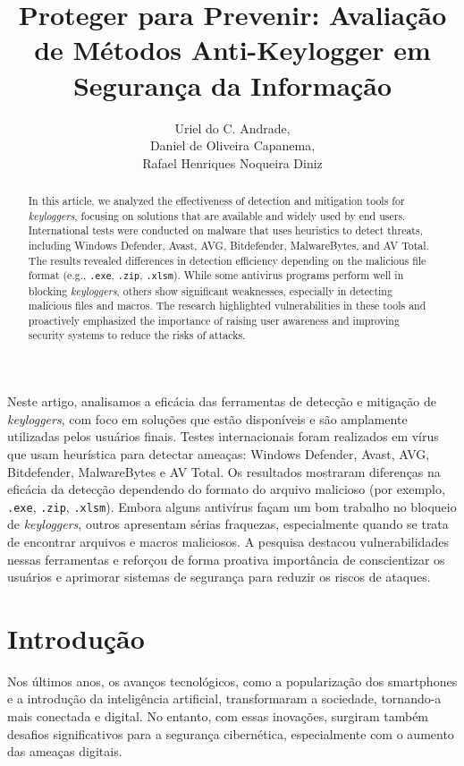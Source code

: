 \documentclass[12pt]{article}
\title{Proteger para Prevenir: Avaliação de Métodos Anti-Keylogger em Segurança da Informação\\ }
\author{Uriel do C. Andrade\inst{1},\\
Daniel de Oliveira Capanema\inst{1}, \\
Rafael Henriques Noqueira Diniz\inst{1}}
\begin{document}
\maketitle
\begin{abstract}
    In this article, we analyzed the effectiveness of detection and mitigation tools for \textit{keyloggers}, focusing on solutions that are available and widely used by end users. International tests were conducted on malware that uses heuristics to detect threats, including Windows Defender, Avast, AVG, Bitdefender, MalwareBytes, and AV Total. The results revealed differences in detection efficiency depending on the malicious file format (e.g., \texttt{.exe}, \texttt{.zip}, \texttt{.xlsm}). While some antivirus programs perform well in blocking \textit{keyloggers}, others show significant weaknesses, especially in detecting malicious files and macros. The research highlighted vulnerabilities in these tools and proactively emphasized the importance of raising user awareness and improving security systems to reduce the risks of attacks.
\end{abstract}

\begin{resumo}
    Neste artigo, analisamos a eficácia das ferramentas de detecção e mitigação de \textit{keyloggers}, com foco em soluções que estão disponíveis e são amplamente utilizadas pelos usuários finais. Testes internacionais foram realizados em vírus que usam heurística para detectar ameaças: Windows Defender, Avast, AVG, Bitdefender, MalwareBytes e AV Total. Os resultados mostraram diferenças na eficácia da detecção dependendo do formato do arquivo malicioso (por exemplo, \texttt{.exe}, \texttt{.zip}, \texttt{.xlsm}). Embora alguns antivírus façam um bom trabalho no bloqueio de \textit{keyloggers}, outros apresentam sérias fraquezas, especialmente quando se trata de encontrar arquivos e macros maliciosos.  A pesquisa destacou vulnerabilidades nessas ferramentas e reforçou de forma proativa importância de conscientizar os usuários e aprimorar sistemas de segurança para reduzir os riscos de ataques.\end{resumo}
\section{Introdução}

Nos últimos anos, os avanços tecnológicos, como a popularização dos smartphones e a introdução da inteligência artificial, transformaram a sociedade, tornando-a mais conectada e digital. No entanto, com essas inovações, surgiram também desafios significativos para a segurança cibernética, especialmente com o aumento das ameaças digitais.
\end{document}
